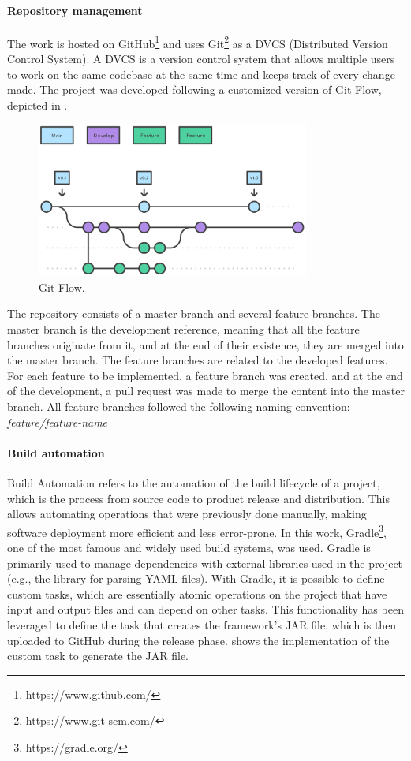 \documentclass[12pt,a4paper,openright,twoside]{book}
\begin{document}
\paragraph*{Repository management}
The work is hosted on GitHub\footnote{https://www.github.com/} and uses Git\footnote{https://www.git-scm.com/} as a DVCS (Distributed Version Control System).
A DVCS is a version control system that allows multiple users to work on the same codebase at the same time and keeps track of every change made.
The project was developed following a customized version of Git Flow, depicted in . 

\begin{figure}[h!]
  \centering
  \includegraphics[width=0.8\textwidth]{figures/gitflow.png}
  \caption{Git Flow.}
  \label{fig:git-flow}
\end{figure}

The repository consists of a master branch and several feature branches.
The master branch is the development reference, meaning that all the feature branches originate from it, and at the end of their existence, they are merged into the master branch.
The feature branches are related to the developed features. 
For each feature to be implemented, a feature branch was created, and at the end of the development, a pull request was made to merge the content into the master branch.
All feature branches followed the following naming convention: \textit{feature/{feature-name}}

\paragraph*{Build automation}
Build Automation refers to the automation of the build lifecycle of a project, which is the process from source code to product release and distribution. 
This allows automating operations that were previously done manually, making software deployment more efficient and less error-prone.
In this work, Gradle\footnote{https://gradle.org/}, one of the most famous and widely used build systems, was used. 
Gradle is primarily used to manage dependencies with external libraries used in the project (e.g., the library for parsing YAML files).
With Gradle, it is possible to define custom tasks, which are essentially atomic operations on the project that have input and output files and can depend on other tasks. 
This functionality has been leveraged to define the task that creates the framework's JAR file, which is then uploaded to GitHub during the release phase.
 shows the implementation of the custom task to generate the JAR file.
\end{document}
